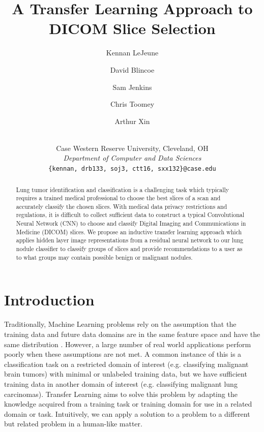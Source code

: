 \documentclass[10pt,twocolumn,letterpaper]{article}
\begin{document}
\title{A Transfer Learning Approach to DICOM Slice Selection}

\author{Kennan LeJeune\\
   \and
   David Blincoe\\
   \and
   Sam Jenkins\\
   \and
   Chris Toomey\\
   \and
   Arthur Xin\\
   \and
   \\
   {Case Western Reserve University, Cleveland, OH}\\
   {\textit{Department of Computer and Data Sciences}}\\
   {\tt\small \{kennan, drb133, soj3, ctt16, sxx132\}@case.edu}
}
\maketitle

\begin{abstract}
   Lung tumor identification and classification is a challenging task which typically requires a trained medical
   professional to choose the best slices of a scan and accurately classify the chosen slices. With medical data privacy restrictions
   and regulations, it is difficult to collect sufficient data to construct a typical Convolutional Neural Network (CNN) to
   choose and classify Digital Imaging and Communications in Medicine (DICOM) slices. We propose an inductive transfer learning approach which applies hidden layer
   image representations from a residual neural network to our lung nodule classifier to classify groups of slices and provide
   recommendations to a user as to what groups may contain possible benign or malignant nodules.
\end{abstract}

\section{Introduction} \label{sec:intro}

   Traditionally, Machine Learning problems rely on the assumption that the training data and future data domains
   are in the same feature space and have the same distribution \cite{pan_yang_2010}. However, a large number of real world
   applications perform poorly when these assumptions are not met. A common instance of this is a classification task on
   a restricted domain of interest (e.g. classifying malignant brain tumors) with minimal or unlabeled training data,
   but we have sufficient training data in another domain of interest (e.g. classifying malignant lung carcinomas).
   Transfer Learning aims to solve this problem by adapting the knowledge acquired from a training task or
   training domain for use in a related domain or task. Intuitively, we can apply a solution to a problem to a
   different but related problem in a human-like matter.
\end{document}
